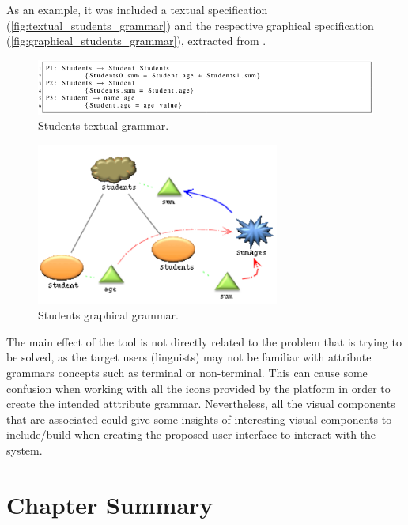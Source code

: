 As an example, it was included a textual specification (\autoref{fig:textual_students_grammar}) 
and the respective graphical specification (\autoref{fig:graphical_students_grammar}), extracted from \cite{oliveira_2009}.

\begin{figure}[h]
\centering
\includegraphics[width=15cm]{images/textual_students_grammar.png}
\caption{Students textual grammar.}
\label{fig:textual_students_grammar}
\end{figure}

\newpage

\begin{figure}[h]
\centering
\includegraphics[width=8cm]{images/graphical_students_grammar.png}
\caption{Students graphical grammar.}
\label{fig:graphical_students_grammar}
\end{figure}

The main effect of the tool is not directly related to the problem that is trying to be solved, as the target users (linguists) may not be familiar with attribute grammars concepts such as 
terminal or non-terminal.
This can cause some confusion when working with all the icons provided by the platform in order to create the intended atttribute grammar.
Nevertheless, all the visual components that are associated could give some insights of interesting visual components to include/build when creating the proposed user interface to interact with the system.


\section{Chapter Summary} %

